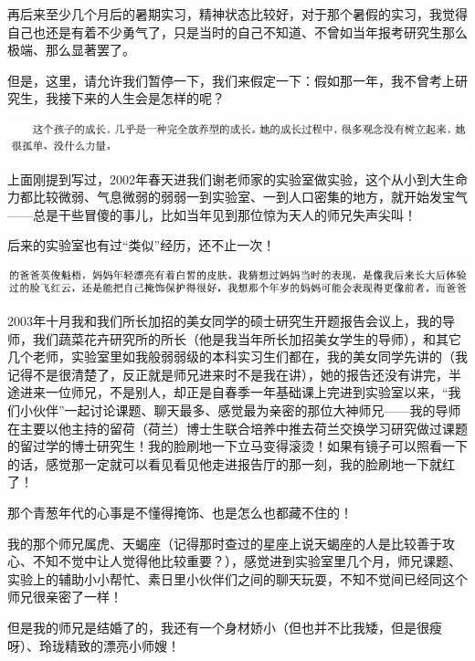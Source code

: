 \documentclass[9pt, b5paper]{article}
\begin{document}
再后来至少几个月后的暑期实习，精神状态比较好，对于那个暑假的实习，我觉得自己也还是有着不少勇气了，只是当时的自己不知道、不曾如当年报考研究生那么极端、那么显著罢了。

但是，这里，请允许我们暂停一下，我们来假定一下：假如那一年，我不曾考上研究生，我接下来的人生会是怎样的呢？

\begin{center}
\includegraphics[width=.9\linewidth]{./pic/backups_plans_20210503_103912.png}
\end{center}

上面刚提到写过，2002年春天进我们谢老师家的实验室做实验，这个从小到大生命力都比较微弱、气息微弱的弱弱一到实验室、一到人口密集的地方，就开始发宝气——总是干些冒傻的事儿，比如当年见到那位惊为天人的师兄失声尖叫！

后来的实验室也有过“类似”经历，还不止一次！

\begin{center}
\includegraphics[width=.9\linewidth]{./pic/backups_plans_20210422_110008.png}
\end{center}

2003年十月我和我们所长加招的美女同学的硕士研究生开题报告会议上，我的导师，我们蔬菜花卉研究所的所长（他是我当年所长加招美女学生的导师），和其它几个老师，实验室里如我般弱弱级的本科实习生们都在，我的美女同学先讲的（我记得不是很清楚了，反正就是师兄进来时不是我在讲），她的报告还没有讲完，半途进来一位师兄，不是别人，却正是自春季一年基础课上完进到实验室以来，“我们小伙伴”一起讨论课题、聊天最多、感觉最为亲密的那位大神师兄——我的导师在主要以他主持的留荷（荷兰）博士生联合培养中推去荷兰交换学习研究做过课题的留过学的博士研究生！我的脸刷地一下立马变得滚烫！如果有镜子可以照看一下的话，感觉那一定就可以看见看见他走进报告厅的那一刻，我的脸刷地一下就红了！

那个青葱年代的心事是不懂得掩饰、也是怎么也都藏不住的！

我的那个师兄属虎、天蝎座（记得那时查过的星座上说天蝎座的人是比较善于攻心、不知不觉中让人觉得他比较重要？），感觉进到实验室里几个月，师兄课题、实验上的辅助小小帮忙、素日里小伙伴们之间的聊天玩耍，不知不觉间已经同这个师兄很亲密了一样！

但是我的师兄是结婚了的，我还有一个身材娇小（但也并不比我矮，但是很瘦呀）、玲珑精致的漂亮小师嫂！
\end{document}
